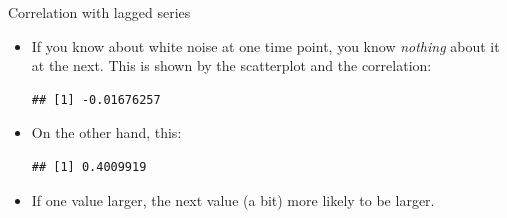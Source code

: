 \begin{frame}[fragile]{Correlation with lagged series}
  \begin{itemize}
  \item If you know about white noise at one time point, you know
    \emph{nothing} about it at the next. This is shown by the scatterplot
    and the correlation:
\begin{knitrout}
\color{fgcolor}\begin{kframe}
\begin{alltt}
\hlstd{=}\hlstd{)}
\end{alltt}
\begin{verbatim}
## [1] -0.01676257
\end{verbatim}
\end{kframe}
\end{knitrout}
  \item On the other hand, this:
\begin{knitrout}
\color{fgcolor}\begin{kframe}
\begin{alltt}
\hlkwb{=}\hlstd{(}
\hlkwb{=}\hlstd{)}
\hlstd{=}\hlstd{)}
\end{alltt}
\begin{verbatim}
## [1] 0.4009919
\end{verbatim}
\end{kframe}
\end{knitrout}

\item If one value larger, the next value (a bit) more likely to be larger. 


  \end{itemize}
\end{frame}


